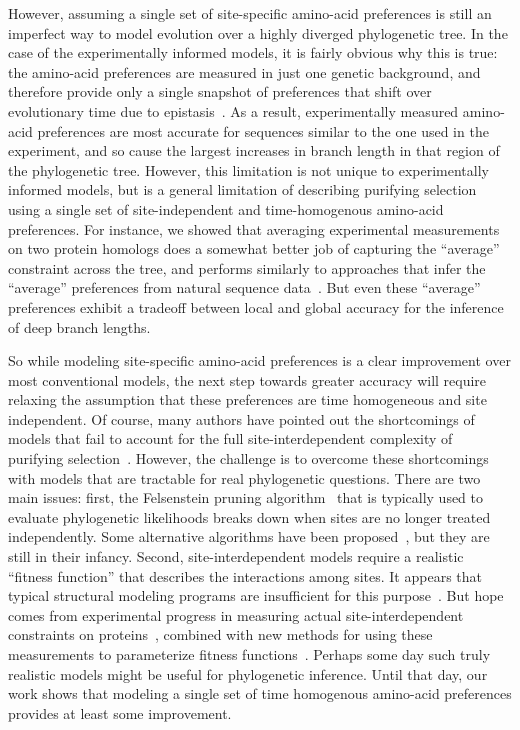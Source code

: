 \documentclass[11pt]{article}
\begin{document}
However, assuming a single set of site-specific amino-acid preferences is still an imperfect way to model evolution over a highly diverged phylogenetic tree. 
In the case of the experimentally informed models, it is fairly obvious why this is true: the amino-acid preferences are measured in just one genetic background, and therefore provide only a single snapshot of preferences that shift over evolutionary time due to epistasis~\citep{pollock2012amino, shah2015contingency, bazykin2015changing, haddox2018mapping, starr2018pervasive, doud2015site}. 
As a result, experimentally measured amino-acid preferences are most accurate for sequences similar to the one used in the experiment, and so cause the largest increases in branch length in that region of the phylogenetic tree.
However, this limitation is not unique to experimentally informed models, but is a general limitation of describing purifying selection using a single set of site-independent and time-homogenous amino-acid preferences.
For instance, we showed that averaging experimental measurements on two protein homologs does a somewhat better job of capturing the ``average'' constraint across the tree, and performs similarly to approaches that infer the ``average'' preferences from natural sequence data~\citep{rodrigue2010mutation,rodrigue2014site}.
But even these ``average'' preferences exhibit a tradeoff between local and global accuracy for the inference of deep branch lengths.

So while modeling site-specific amino-acid preferences is a clear improvement over most conventional models, the next step towards greater accuracy will require relaxing the assumption that these preferences are time homogeneous and site independent.
Of course, many authors have pointed out the shortcomings of models that fail to account for the full site-interdependent complexity of purifying selection~\citep{rodrigue2005site, choi2007quantifying, pollock2012amino, goldstein2017sequence}.
However, the challenge is to overcome these shortcomings with models that are tractable for real phylogenetic questions.
There are two main issues: first, the Felsenstein pruning algorithm~\citep{felsenstein1981evolutionary} that is typically used to evaluate phylogenetic likelihoods breaks down when sites are no longer treated independently.
Some alternative algorithms have been proposed~\citep{bordner2013new,rodrigue2009computational,rodrigue2005site, choi2007quantifying}, but they are still in their infancy.
Second, site-interdependent models require a realistic ``fitness function'' that describes the interactions among sites.
It appears that typical structural modeling programs are insufficient for this purpose~\citep{rodrigue2009computational}.
But hope comes from experimental progress in measuring actual site-interdependent constraints on proteins~\citep{olson2014comprehensive,wu2016adaptation,steinberg2016shifting,li2016fitness}, combined with new methods for using these measurements to parameterize fitness functions~\citep{sailer2017detecting,otwinowski2018inferring,otwinowski2018protein}.
Perhaps some day such truly realistic models might be useful for phylogenetic inference.
Until that day, our work shows that modeling a single set of time homogenous amino-acid preferences provides at least some improvement.
\end{document}
